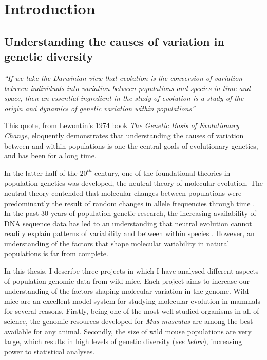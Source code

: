 \chapter{Introduction}

\section{Understanding the causes of variation in genetic diversity}

	\textit{``If we take the Darwinian view that evolution is the conversion of variation between individuals into variation between populations and species in time and space, then an essential ingredient in the study of evolution is a study of the origin and dynamics of genetic variation within populations''}\citep{RN183}

\noindent
This quote, from Lewontin's 1974 book \textit{The Genetic Basis of Evolutionary Change}, eloquently demonstrates that understanding the causes of variation between and within populations is one the central goals of evolutionary genetics, and has been for a long time.
	
	 In the latter half of the $20^{th}$ century, one of the foundational theories in population genetics was developed, the neutral theory of molecular evolution. The neutral theory contended that molecular changes between populations were predominantly the result of random changes in allele frequencies through time \citep{RN175}. In the past 30 years of population genetic research, the increasing availability of DNA sequence data has led to an understanding that neutral evolution cannot readily explain patterns of variability and between within species \citep{RN358}. However, an understanding of the factors that shape molecular variability in natural populations is far from complete.

	In this thesis, I describe three projects in which I have analysed different aspects of population genomic data from wild mice. Each project aims to increase our understanding of the factors shaping molecular variation in the genome. Wild mice are an excellent model system for studying molecular evolution in mammals for several reasons. Firstly, being one of the most well-studied organisms in all of science, the genomic resources developed for \textit{Mus musculus} are among the best available for any animal. Secondly, the size of wild mouse populations are very large, which results in high levels of genetic diversity (\textit{see below}), increasing power to statistical analyses. 

